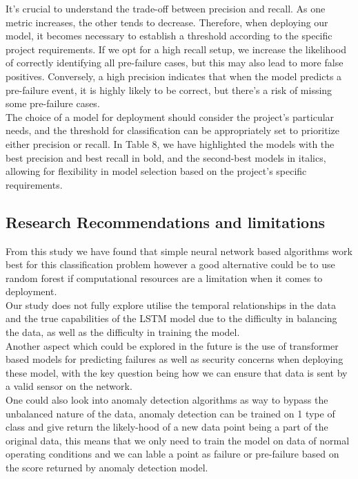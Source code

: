 \documentclass{article}
\begin{document}
It's crucial to understand the trade-off between precision and recall. As one metric increases, the other tends to decrease. Therefore, when deploying our model, it becomes necessary to establish a threshold according to the specific project requirements. If we opt for a high recall setup, we increase the likelihood of correctly identifying all pre-failure cases, but this may also lead to more false positives. Conversely, a high precision indicates that when the model predicts a pre-failure event, it is highly likely to be correct, but there's a risk of missing some pre-failure cases.\\

The choice of a model for deployment should consider the project's particular needs, and the threshold for classification can be appropriately set to prioritize either precision or recall. In Table 8, we have highlighted the models with the best precision and best recall in bold, and the second-best models in italics, allowing for flexibility in model selection based on the project's specific requirements. \\

\subsection{Research Recommendations and limitations}

From this study we have found that simple neural network based algorithms work best for this classification problem however a good alternative could be to use random forest if computational resources are a limitation when it comes to deployment. \\

Our study does not fully explore utilise the temporal relationships in the data and the true capabilities of the LSTM model due to the difficulty in balancing the data, as well as the difficulty in training the model. \\

Another aspect which could be explored in the future is the use of transformer based models for predicting failures as well as security concerns when deploying these model, with the key question being how we can ensure that data is sent by a valid sensor on the network.\\

One could also look into anomaly detection algorithms as way to bypass the unbalanced nature of the data, anomaly detection can be trained on 1 type of class and give return the likely-hood of a new data point being a part of the original data, this means that we only need to train the model on data of normal operating conditions and we can lable a point as failure or pre-failure based on the score returned by anomaly detection model. \cite{Choi2021}\\
\end{document}
